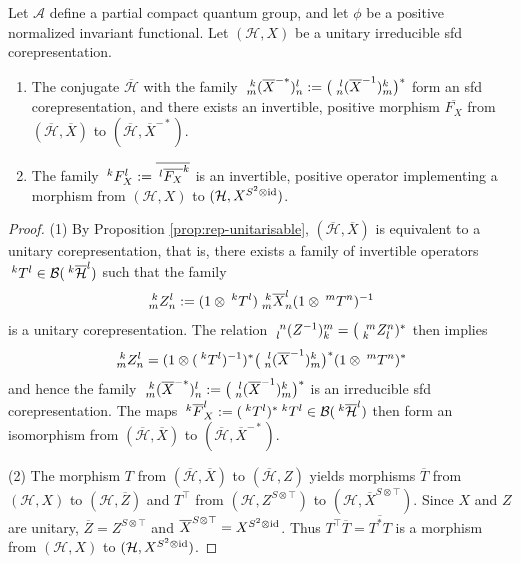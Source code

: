\begin{Prop} \label{prop:rep-f}
  Let $\mathscr{A}$ define a partial compact quantum group, and let $\phi$ be a positive normalized
  invariant functional. Let $(\mathcal{H},X)$ be a unitary
  irreducible sfd corepresentation. 
  \begin{enumerate}
  \item The conjugate $\overline{\mathcal{H}}$ with the family
    $\Gr{(\overline{X}^{-*})}{k}{l}{m}{n}:=\big(\Gr{(\overline{X}^{-1})}{l}{k}{n}{m}\big)^{*}$
    form an sfd corepresentation, and there
    exists an invertible, positive morphism $\overline{F_{X}}$ from
    $(\overline{\mathcal{H}},\overline{X})$ to
    $(\overline{\mathcal{H}},\overline{X}^{-*})$. %
  \item The family
    $\Gru{F_{X}}{k}{l}:=\overline{\Gru{\overline{F_{X}}}{l}{k}}$ is an
    invertible, positive operator implementing a morphism from $(\mathcal{H},X)$ to
    $(\mathcal{H},X^{S^{2} \otimes \id})$.
  \end{enumerate}
\end{Prop}
\begin{proof}
(1) By Proposition \ref{prop:rep-unitarisable},
$(\overline{\mathcal{H}},\overline{X})$ is equivalent to a unitary
corepresentation, that is, there exists a family of invertible operators
$\Gru{T}{k}{l} \in \mathcal{B}(\Gru{\overline{\mathcal{H}}}{k}{l})$
such that the family 
\begin{align*}
\Gr{Z}{k}{l}{m}{n}:= (1 \otimes
\Gru{T}{k}{l})\Gr{\overline{X}}{k}{l}{m}{n}(1 \otimes
\Gru{T}{m}{n})^{-1} 
\end{align*}
 is a unitary corepresentation. The relation
 $\Gr{(Z^{-1})}{n}{m}{l}{k}=\big(\Gr{Z}{m}{n}{k}{l})^{*}$ then implies
 \begin{align*}
   \Gr{Z}{k}{l}{m}{n} = (1 \otimes
   (\Gru{T}{k}{l})^{-1})^{*}\big(\Gr{(\overline{X}^{-1})}{l}{k}{n}{m}\big)^{*}(1
   \otimes \Gru{T}{m}{n})^{*}
 \end{align*}
 and hence the family 
 $\Gr{(\overline{X}^{-*})}{k}{l}{m}{n}:=\big(\Gr{(\overline{X}^{-1})}{l}{k}{n}{m}\big)^{*}$
 is an irreducible sfd corepresentation. The maps
 $\Gru{\overline{F}_{X}}{k}{l}:=(\Gru{T}{k}{l})^{*}\Gru{T}{k}{l} \in
  \mathcal{B}(\Gru{\overline{\mathcal{H}}}{k}{l})$
then form an isomorphism from $(\overline{\mathcal{H}},\overline{X})$ to
$(\overline{\mathcal{H}},\overline{X}^{-*})$.   

(2) The morphism $T$  from $(\overline{\mathcal{H}},\overline{X})$  to
$(\overline{\mathcal{H}},Z)$ yields morphisms $\overline{T}$ from
$(\mathcal{H},X)$ to $(\mathcal{H},\overline{Z})$ and $T^{\top}$ from $(\mathcal{H},Z^{S\otimes\top})$ to
$(\mathcal{H},\overline{X}^{S \otimes \top})$. Since $X$ and $Z$ are
unitary, $\overline{Z}=Z^{S\otimes \top}$ and  $\overline{X}^{S \otimes
  \top} = X^{S^{2} \otimes \id}$. Thus $T^{\top}\overline{T} =
\overline{T^{*}T}$ is a morphism from $(\mathcal{H},X)$ to
$(\mathcal{H},X^{S^{2}\otimes \id})$.
\end{proof}



